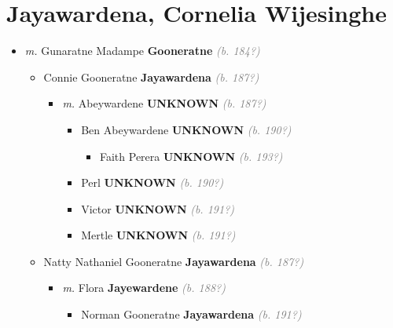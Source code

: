 \documentclass[10pt, openany]{book}
\begin{document}
\chapter{Jayawardena, Cornelia Wijesinghe}
\label{00003126}
\textcolor{slmaroon}{\textit{}}
\begin{itemize}
\item{\textit{m.} Gunaratne Madampe \textbf{Gooneratne} \textcolor{gray}{\textit{(b. 184?)}}   \label{couple:00003126:00003127} \begin{itemize}
\item{Connie Gooneratne \textbf{Jayawardena} \textcolor{gray}{\textit{(b. 187?)}}
\begin{itemize}
\item{\textit{m.} Abeywardene \textbf{UNKNOWN} \textcolor{gray}{\textit{(b. 187?)}}   \label{couple:00003177:00003178} \begin{itemize}
\item{Ben Abeywardene \textbf{UNKNOWN} \textcolor{gray}{\textit{(b. 190?)}}
\begin{itemize}
\item{Faith Perera \textbf{UNKNOWN} \textcolor{gray}{\textit{(b. 193?)}}
  }
\end{itemize}
  }
\item{Perl \textbf{UNKNOWN} \textcolor{gray}{\textit{(b. 190?)}}
 }
\item{Victor \textbf{UNKNOWN} \textcolor{gray}{\textit{(b. 191?)}}
 }
\item{Mertle \textbf{UNKNOWN} \textcolor{gray}{\textit{(b. 191?)}}
 }
\end{itemize}}
\end{itemize}
  }
\item{Natty Nathaniel Gooneratne \textbf{Jayawardena} \textcolor{gray}{\textit{(b. 187?)}}
\begin{itemize}
\item{\textit{m.} Flora \textbf{Jayewardene} \textcolor{gray}{\textit{(b. 188?)}}   \label{couple:00003186:00003187} \begin{itemize}
\item{Norman Gooneratne \textbf{Jayawardena} \textcolor{gray}{\textit{(b. 191?)}}
  }
\end{itemize}}
\end{itemize}
}
\end{itemize}}
\end{itemize}
\end{document}
